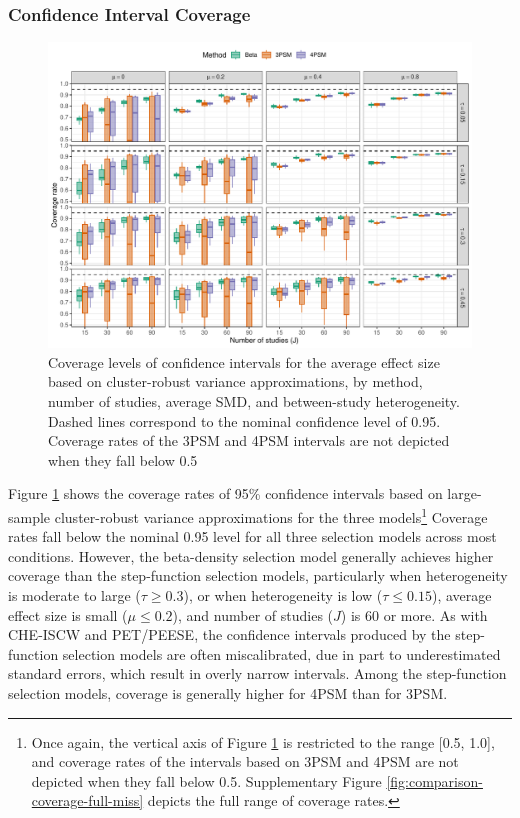 \documentclass[
  american,
  man, donotrepeattitle,floatsintext]{apa7}
\begin{document}
\subsubsection{Confidence Interval Coverage}\label{confidence-interval-coverage-1}

\begin{figure}
\includegraphics{beta-function-selection-models-with-dependent-effects_files/figure-latex/comparison-coverage-miss-1} \caption{Coverage levels of confidence intervals for the average effect size based on cluster-robust variance approximations, by method, number of studies, average SMD, and between-study heterogeneity. Dashed lines correspond to the nominal confidence level of 0.95. Coverage rates of the 3PSM and 4PSM intervals are not depicted when they fall below 0.5}\label{fig:comparison-coverage-miss}
\end{figure}

Figure \ref{fig:comparison-coverage-miss} shows the coverage rates of 95\% confidence intervals based on large-sample cluster-robust variance approximations for the three models\footnote{Once again, the vertical axis of Figure \ref{fig:comparison-coverage-miss} is restricted to the range {[}0.5, 1.0{]}, and coverage rates of the intervals based on 3PSM and 4PSM are not depicted when they fall below 0.5. Supplementary Figure \ref{fig:comparison-coverage-full-miss} depicts the full range of coverage rates.}
Coverage rates fall below the nominal 0.95 level for all three selection models across most conditions. However, the beta-density selection model generally achieves higher coverage than the step-function selection models, particularly when heterogeneity is moderate to large (\(\tau \geq 0.3\)), or when heterogeneity is low (\(\tau \leq 0.15\)), average effect size is small (\(\mu \leq 0.2\)), and number of studies (\(J\)) is 60 or more. As with CHE-ISCW and PET/PEESE, the confidence intervals produced by the step-function selection models are often miscalibrated, due in part to underestimated standard errors, which result in overly narrow intervals. Among the step-function selection models, coverage is generally higher for 4PSM than for 3PSM.
\end{document}
